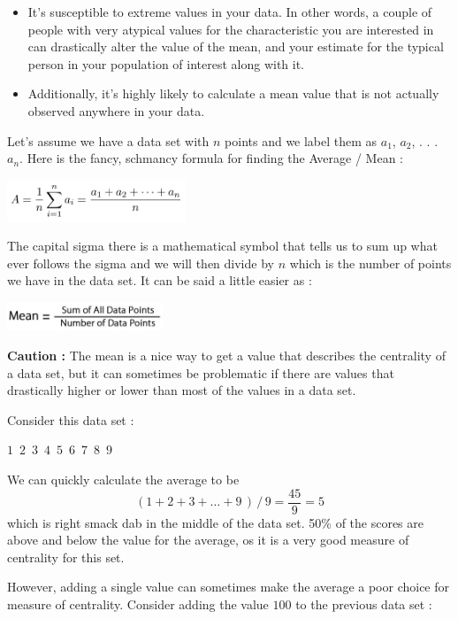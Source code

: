 \documentclass[
  letterpaper,
  DIV=11,
  numbers=noendperiod]{scrreprt}
\begin{document}
\begin{itemize}
\item
  It's susceptible to extreme values in your data. In other words, a
  couple of people with very atypical values for the characteristic you
  are interested in can drastically alter the value of the mean, and
  your estimate for the typical person in your population of interest
  along with it.
\item
  Additionally, it's highly likely to calculate a mean value that is not
  actually observed anywhere in your data.
\end{itemize}

Let's assume we have a data set with \(n\) points and we label them as
\(a_1\), \(a_2\), . . . \(a_n\). Here is the fancy, schmancy formula for
finding the Average / Mean :

\includegraphics[width=0.4\textwidth,height=\textheight]{./images/Daily-4-Pic-8.jpg}

The capital sigma there is a mathematical symbol that tells us to sum up
what ever follows the sigma and we will then divide by \(n\) which is
the number of points we have in the data set. It can be said a little
easier as :

\includegraphics[width=0.35\textwidth,height=\textheight]{./images/Daily-4-Pic-9.jpg}

\textbf{Caution :} The mean is a nice way to get a value that describes
the centrality of a data set, but it can sometimes be problematic if
there are values that drastically higher or lower than most of the
values in a data set.

Consider this data set :

\(1 \,\,\,2 \,\,\,3\,\,\,4\,\,\,5\,\,\,6\,\,\,7\,\,\,8\,\,\,9\)

We can quickly calculate the average to be
\[(1 + 2 + 3 + \dots +9\,)\,/\,9 = \frac{45}{9}=5\] which is right smack
dab in the middle of the data set. 50\% of the scores are above and
below the value for the average, os it is a very good measure of
centrality for this set.

However, adding a single value can sometimes make the average a poor
choice for measure of centrality. Consider adding the value \(100\) to
the previous data set :
\end{document}
